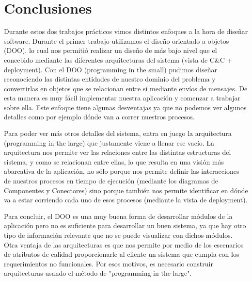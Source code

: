 \documentclass{article}
\theoremstyle{definition}
\theoremstyle{remark}
\begin{document}
\section{Conclusiones}

Durante estos dos trabajos prácticos vimos distintos enfoques a la hora de diseñar software. Durante el primer trabajo utilizamos el diseño orientado a objetos (DOO), lo cual nos permitió realizar un diseño de más bajo nivel que el concebido mediante las diferentes arquitecturas del sistema (vista de C\&C + deployment). Con el DOO (programming in the small) pudimos diseñar reconociendo las distintas entidades de nuestro dominio del problema y convertirlas en objetos que se relacionan entre sí mediante envíos de mensajes. De esta manera es muy fácil implementar nuestra aplicación y comenzar a trabajar sobre ella. Este enfoque tiene algunas desventajas ya que no podemos ver algunos detalles como por ejemplo dónde van a correr nuestros procesos.

Para poder ver más otros detalles del sistema, entra en juego la arquitectura (programming in the large) que justamente viene a llenar ese vacío. La arquitectura nos permite ver las relaciones entre las distintas estructuras del sistema, y como se relacionan entre ellas, lo que resulta en una visión más abarcativa de la aplicación, no sólo porque nos permite definir las interacciones de nuestros procesos en tiempo de ejecución (mediante los diagramas de Componentes y Conectores) sino porque también nos permite identificar en dónde va a estar corriendo cada uno de esos procesos (mediante la vista de deployment).

Para concluir, el DOO es una muy buena forma de desarrollar módulos de la aplicación pero no es suficiente para desarrollar un buen sistema, ya que hay otro tipo de información relevante que no se puede visualizar con dichos módulos. Otra ventaja de las arquitecturas es que nos permite por medio de los escenarios de atributos de calidad proporcionarle al cliente un sistema que cumpla con los requerimientos no funcionales. Por esos motivos, es necesario construir arquitecturas usando el método de "programming in the large".
\end{document}
